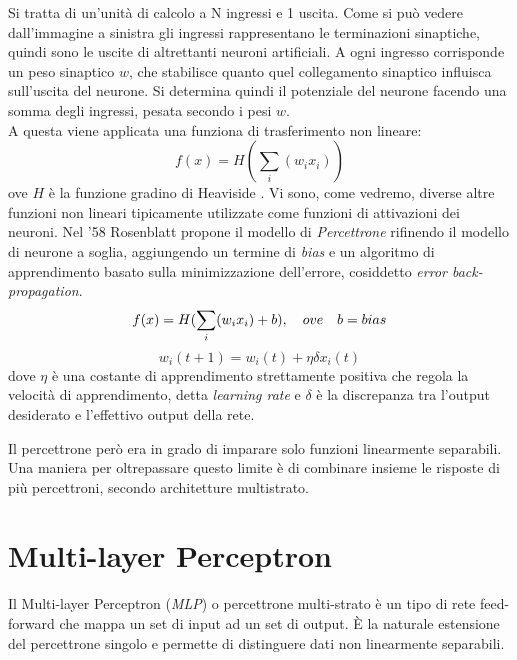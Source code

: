 Si tratta di un'unità di calcolo a N ingressi e 1 uscita. Come si può vedere dall'immagine a
sinistra gli ingressi rappresentano le terminazioni sinaptiche, quindi sono le uscite di altrettanti
neuroni artificiali. A ogni ingresso corrisponde un peso sinaptico $w$, che stabilisce quanto quel
collegamento sinaptico influisca sull'uscita del neurone. Si determina quindi il potenziale del neurone facendo una somma degli ingressi, pesata secondo i pesi $w$. \\
A questa viene applicata una funziona di trasferimento non lineare: 
\begin{equation}
 f(x) = H(\sum_{i}(w_i x_i))
\end{equation} 
ove $H$ è la funzione gradino di Heaviside \parencite{WHeaviside}. Vi sono, come vedremo, diverse altre funzioni non lineari tipicamente utilizzate come funzioni di attivazioni dei neuroni. 
Nel '58 Rosenblatt propone il modello di \emph{Percettrone} rifinendo il modello di neurone a soglia, aggiungendo un termine di \emph{bias} e un algoritmo di apprendimento basato sulla minimizzazione dell'errore, cosiddetto \emph{error back-propagation}\parencite{WPercettrone}.
\begin{equation}
 f(x) = H(\sum_{i}(w_i x_i)+b),\quad ove \quad b = bias \\
\end{equation}
\begin{equation} 
 w_i(t+1) = w_i(t)+\eta \delta x_i(t)
\end{equation}
dove $\eta$ è una costante di apprendimento strettamente positiva che regola la velocità di apprendimento, detta \emph{learning rate} e $\delta$ è la discrepanza tra l'output desiderato e l'effettivo output della rete. 

Il percettrone però era in grado di imparare solo funzioni linearmente separabili. Una maniera per oltrepassare questo limite è di combinare insieme le risposte di più percettroni, secondo architetture multistrato. 

\section{Multi-layer Perceptron}
\label{sec:mlp}
Il Multi-layer Perceptron (\textit{MLP}) o percettrone multi-strato è un tipo di rete feed-forward che mappa un set di input ad un set di output. È la naturale estensione del percettrone singolo e permette di distinguere dati non linearmente separabili.

